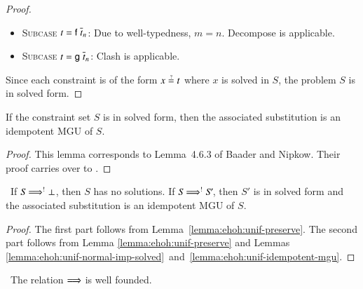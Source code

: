 \begin{proof}
\begin{itemize}
    \item \textsc{Subcase} $t = \mathsf{f} \; \overline{t}_{n}$:
      Due to well-typedness, $m = n$. \textsf{Decompose} is
      applicable.

    \item \textsc{Subcase} $t = \mathsf{g} \; \overline{t}_{n}$:
      \textsf{Clash} is applicable.
    \end{itemize}

    \noindent
    Since each constraint is of the form $x \unif t$ where $x$ is solved in
    $\mathit{S}$, the problem $\mathit{S}$ is in solved form.
  \end{proof}

  \begin{lemma}\label{lemma:ehoh:unif-idempotent-mgu}
    If the constraint set $\mathit{S}$ is in solved form, then the associated
    substitution is an idempotent MGU of $\mathit{S}.$
  \end{lemma}
  \begin{proof}
    This lemma corresponds to Lemma~4.6.3 of Baader and Nipkow. Their proof
    carries over to \lfhol{}.
  \end{proof}

  \begin{theorem}\label{thm:ehoh:unif-partial-correctness}\,%
    If $\mathit{S} \Longrightarrow^{!} \bot$, then $\mathit{S}$ has no solutions.
    If $\mathit{S} \Longrightarrow^{!} \mathit{S}'\!$, then $\mathit{S}'$ is in solved form and the
    associated substitution is an idempotent MGU of $\mathit{S}$.
    \end{theorem}

    \begin{proof}
    The first part follows from Lemma~\ref{lemma:ehoh:unif-preserve}.
    The second part follows from Lemma \ref{lemma:ehoh:unif-preserve}
    and Lemmas
    \ref{lemma:ehoh:unif-normal-imp-solved}~and~\ref{lemma:ehoh:unif-idempotent-mgu}.
    \end{proof}

      \newpage
      \begin{theorem}[Termination]\label{thm:ehoh:unif-termination}\,%
      The relation $\Longrightarrow$ is well founded.
      \end{theorem}
    
